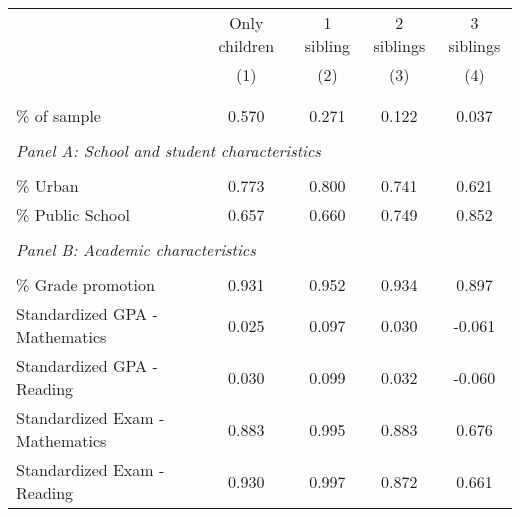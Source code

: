 \makeatletter
{}
{
\makeatother
\begin{tabular}{lcccc}
\toprule
& Only children & 1 sibling & 2 siblings & 3 siblings  \\
\cmidrule(lr){2-2} \cmidrule(lr){3-3} \cmidrule(lr){4-4} \cmidrule(lr){5-5}
& (1) & (2) & (3) & (4)\\
\bottomrule
&  &  &  & \\
            &            &            &            &            \\
\% of sample &       0.570&       0.271&       0.122&       0.037\\
&  &  &   \\
\multicolumn{4}{l}{\textit{Panel A: School and student characteristics}} \\
            &            &            &            &            \\
\% Urban    &       0.773&       0.800&       0.741&       0.621\\
\% Public School&       0.657&       0.660&       0.749&       0.852\\
&  &  &   \\
\multicolumn{4}{l}{\textit{Panel B: Academic characteristics}} \\
            &            &            &            &            \\
\% Grade promotion&       0.931&       0.952&       0.934&       0.897\\
Standardized GPA - Mathematics &       0.025&       0.097&       0.030&      -0.061\\
Standardized GPA - Reading &       0.030&       0.099&       0.032&      -0.060\\
Standardized Exam - Mathematics&       0.883&       0.995&       0.883&       0.676\\
Standardized Exam - Reading&       0.930&       0.997&       0.872&       0.661\\

\end{tabular}}

